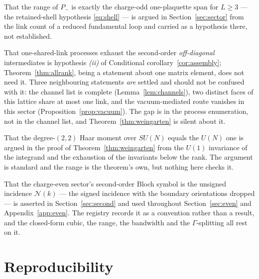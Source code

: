 \documentclass[10pt,twocolumn]{article}
\theoremstyle{plain}
\theoremstyle{definition}
\theoremstyle{remark}
\begin{document}
That the range of $P_-$ is exactly the charge-odd one-plaquette span for
$L\ge3$ --- the retained-shell hypothesis \eqref{eq:shell} --- is argued in
Section~\ref{sec:sector} from the link count of a reduced fundamental loop and
carried as a hypothesis there, not established.

That one-shared-link processes exhaust the second-order \emph{off-diagonal}
intermediates is hypothesis \emph{(ii)} of
Conditional corollary~\ref{cor:assembly}; Theorem~\ref{thm:allrank}, being a
statement about one matrix element, does not need it. Three neighbouring
statements \emph{are} settled and should not be confused with it: the channel
list is complete (Lemma~\ref{lem:channels}), two distinct faces of this lattice
share at most one link, and the vacuum-mediated route vanishes in this sector
(Proposition~\ref{prop:vacuum}). The gap is in the process enumeration, not in
the channel list, and Theorem~\ref{thm:weingarten} is silent about it.

That the degree-$(2,2)$ Haar moment over $SU(N)$ equals the $U(N)$ one is
argued in the proof of Theorem~\ref{thm:weingarten} from the $U(1)$ invariance
of the integrand and the exhaustion of the invariants below the rank. The
argument is standard and the range is the theorem's own, but nothing here
checks it.

That the charge-even sector's second-order Bloch symbol is the unsigned
incidence $\mathcal N(k)$ --- the signed incidence with the boundary
orientations dropped --- is asserted in Section~\ref{sec:second} and used
throughout Section~\ref{sec:even} and Appendix~\ref{app:even}. The registry
records it as a convention rather than a result, and the closed-form cubic, the
range, the bandwidth and the $\Gamma$-splitting all rest on it.

\section{Reproducibility}
\label{sec:repro}
\end{document}
